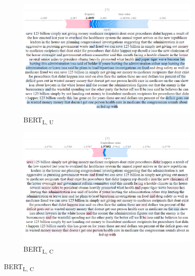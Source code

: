 \begin{figure}[!h]
    \begin{subfigure}[t]{0.4\textwidth}
        \includegraphics[width=\textwidth]{figs/all_F/bert-l-u.png}
        \caption{{BERT}\textsubscript{L, U}}
    \end{subfigure}
    \hspace{\fill} %
    \begin{subfigure}[t]{0.4\textwidth}
        \includegraphics[width=\linewidth]{figs/all_F/bert-l-c.png}
        \caption{{BERT}\textsubscript{L, C}}
    \end{subfigure}




\end{figure}
